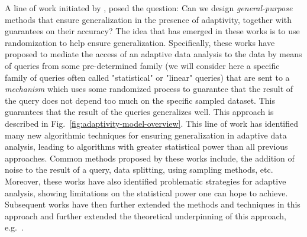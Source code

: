 A line of work initiated by \citet{DworkFHPRR15}, \citet{HardtU14} posed the question: Can we design \emph{general-purpose} methods that ensure generalization in the presence of adaptivity, together with guarantees on their accuracy?  The idea that has emerged in these works is to use randomization to help ensure generalization. Specifically, these works have proposed to mediate the access of an adaptive data analysis to the data by means of queries from some pre-determined family (we will consider here a specific family of queries often called "statistical" or "linear" queries) that are sent to a  \emph{mechanism} which uses some randomized process to guarantee that the result of the query does not depend too much on the specific
sampled dataset. This guarantees that the result of the queries generalizes well. This approach is described in Fig.~\ref{fig:adaptivity-model-overview}.  
This line of work has identified many new algorithmic techniques for ensuring generalization in adaptive data analysis, leading to algorithms with greater statistical power than all previous approaches. Common methods proposed by these works include, the addition of noise to the result of a query, data splitting, using sampling methods, etc. Moreover, these works have also identified problematic strategies for adaptive analysis, showing limitations on the statistical power one can hope to achieve. Subsequent works have then further extended the methods and techniques in this approach and further extended the theoretical underpinning of this approach, e.g.~\cite{dwork2015reusable,dwork2015generalization,BassilyNSSSU16,UllmanSNSS18,FeldmanS17,jung2019new,SteinkeZ20,RogersRSSTW20,DaganK22,Blanc23}.


